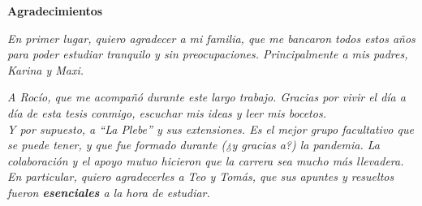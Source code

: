 \thispagestyle{plain}
\begin{center}
\large
\textbf{Agradecimientos}
\end{center}

\textit{
En primer lugar, quiero agradecer a mi familia, que me bancaron todos estos años para poder estudiar tranquilo y sin preocupaciones. Principalmente a mis padres, \mbox{Karina} y \mbox{Maxi}.
}

\textit{
A Rocío, que me acompañó durante este largo trabajo. Gracias por vivir el día a día de esta tesis conmigo,  escuchar mis ideas y leer mis bocetos.
} \\

\textit{
Y por supuesto, a \enquote{La Plebe} y sus extensiones. Es el mejor grupo facultativo que se puede tener, y que fue formado durante (¿y gracias a?) la pandemia. La colaboración y el apoyo mutuo hicieron que la carrera sea mucho más llevadera. En particular, quiero agradecerles a Teo y Tomás, que sus apuntes y resueltos fueron \textbf{esenciales} a la hora de estudiar.
}

\clearpage
